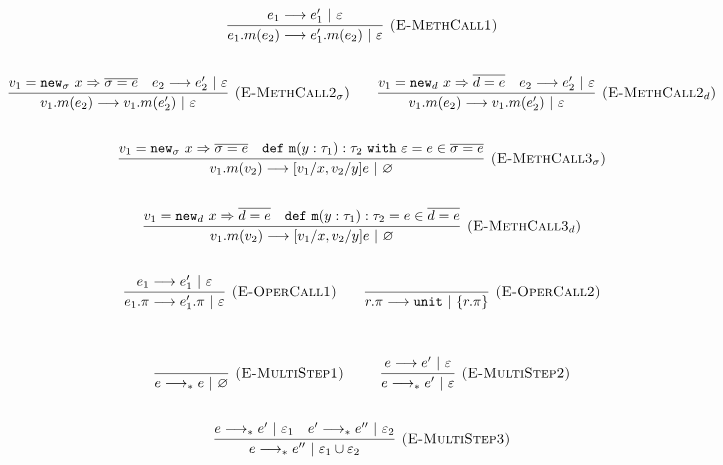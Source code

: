 \documentclass{llncs}
\newcommand{\keywadj}[1]{\mathtt{#1}}
\newcommand{\keyw}[1]{\keywadj{#1}~}
\newcommand{\newd}[0]{
	\keywadj{new}_d~x \Rightarrow \overline{d = e}
}
\newcommand{\newsig}[0]{
	\keywadj{new}_\sigma~x \Rightarrow \overline{\sigma = e}
}
\begin{document}
~\\
\noindent
{}

\[
\begin{array}{c}

	\infer[\textsc{(E-MethCall1)}]
		{e_1.m(e_2) \longrightarrow e_1'.m(e_2)~|~\varepsilon}
		{e_1 \longrightarrow e_1'~|~\varepsilon} \\[5ex]

	\infer[\textsc{(E-MethCall2$_{\sigma}$)}]
		{v_1.m(e_2) \longrightarrow v_1.m(e_2')~|~\varepsilon}
		{v_1 = \newsig & e_2 \longrightarrow e_2'~|~\varepsilon} ~~~~~~
		
	\infer[\textsc{(E-MethCall2$_d$)}]
		{v_1.m(e_2) \longrightarrow v_1.m(e_2')~|~\varepsilon}
		{v_1 = \newd & e_2 \longrightarrow e_2'~|~\varepsilon}\\[5ex]
				
	\infer[\textsc{(E-MethCall3$_{\sigma}$)}]
		{v_1.m(v_2)
			\longrightarrow
		 [v_1/x, v_2/y]e~|~\varnothing}
  		{v_1 = \newsig & \keywadj{def~m}(y: \tau_1) : \tau_2~\keyw{with} \varepsilon = e \in \overline {\sigma = e}} \\[5ex]

	\infer[\textsc{(E-MethCall3$_d$)}]
		{v_1.m(v_2)
			\longrightarrow
		 [v_1/x, v_2/y]e~|~\varnothing}
  		{v_1 = \newd & \keywadj{def~m}(y: \tau_1) : \tau_2 = e \in \overline {d = e}} \\[5ex]

	\infer[\textsc{(E-OperCall1)}]
		{e_1.\pi
			\longrightarrow
		 e_1'.\pi~|~\varepsilon}
		{e_1 \longrightarrow e_1'~|~\varepsilon}
~~~~~~

			\infer[\textsc{(E-OperCall2)}]
		{r.\pi
			\longrightarrow
		 \keywadj{unit}~|~\{r.\pi\}}
		{} \\[5ex]
			
\end{array}
\]
\noindent
{}

\[
\begin{array}{c}

	\infer[\textsc{(E-MultiStep1)}]
	{e \longrightarrow_* e~|~\varnothing}
	{} ~~~~~~~~
	
	\infer[\textsc{(E-MultiStep2)}]
	{e \longrightarrow_* e'~|~\varepsilon}
	{e \longrightarrow e'~|~\varepsilon} \\[5ex]

	\infer[\textsc{(E-MultiStep3)}]
	{e \longrightarrow_* e''~|~\varepsilon_1 \cup \varepsilon_2}
	{e \longrightarrow_* e'~|~\varepsilon_1 & e' \longrightarrow_* e''~|~\varepsilon_2}

\end{array}
\]
\end{document}
